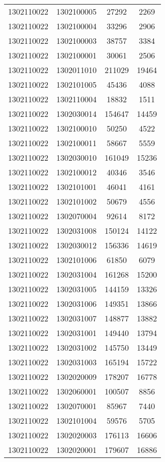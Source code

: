 \begin{longtable}[h]{llcc}
		1302110022 & 1302100005 & 27292 & 2269\\
		1302110022 & 1302100004 & 33296 & 2906\\
		1302110022 & 1302100003 & 38757 & 3384\\
		1302110022 & 1302100001 & 30061 & 2506\\
		1302110022 & 1302011010 & 211029 & 19464\\
		1302110022 & 1302101005 & 45436 & 4088\\
		1302110022 & 1302110004 & 18832 & 1511\\
		1302110022 & 1302030014 & 154647 & 14459\\
		1302110022 & 1302100010 & 50250 & 4522\\
		1302110022 & 1302100011 & 58667 & 5559\\
		1302110022 & 1302030010 & 161049 & 15236\\
		1302110022 & 1302100012 & 40346 & 3546\\
		1302110022 & 1302101001 & 46041 & 4161\\
		1302110022 & 1302101002 & 50679 & 4556\\
		1302110022 & 1302070004 & 92614 & 8172\\
		1302110022 & 1302031008 & 150124 & 14122\\
		1302110022 & 1302030012 & 156336 & 14619\\
		1302110022 & 1302101006 & 61850 & 6079\\
		1302110022 & 1302031004 & 161268 & 15200\\
		1302110022 & 1302031005 & 144159 & 13326\\
		1302110022 & 1302031006 & 149351 & 13866\\
		1302110022 & 1302031007 & 148877 & 13882\\
		1302110022 & 1302031001 & 149440 & 13794\\
		1302110022 & 1302031002 & 145750 & 13449\\
		1302110022 & 1302031003 & 165194 & 15722\\
		1302110022 & 1302020009 & 178207 & 16778\\
		1302110022 & 1302060001 & 100507 & 8856\\
		1302110022 & 1302070001 & 85967 & 7440\\
		1302110022 & 1302101004 & 59576 & 5705\\
		1302110022 & 1302020003 & 176113 & 16606\\
		1302110022 & 1302020001 & 179607 & 16886\\

\end{longtable}
